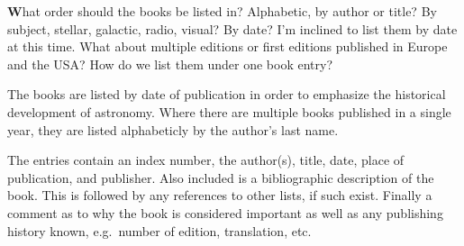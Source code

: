 



\newcommand{\bkentry}[6]{
\stepcounter{bksctr}
\vspace*{1 cm}
\noindent
\hbox{{\bf\arabic{bksctr}  #2 \hfil}}\newline
\hbox{{\it\large #3\hfil}}\newline
\hbox{{\bf #1}, #4 \hfil}\newline
\hbox{#5\hfil}\newline
\hbox{#6\hfil}\newline
\hbox{Comments:\hfil}\newline
}

%
%
\newcommand{\exbkentry}[6]{
\vspace*{1 cm}
\noindent
{\bf Index  #2}\hfil\newline
{\it\large #3}\hfil\newline
{\bf #1}, #4\hfil
#5\hfil\newline
#6\hfil\newline
Comments:\hfil\newline
}


{\textbf What order should the books be listed in? Alphabetic, by
author or title? By subject, stellar, galactic, radio, visual? By
date? I'm inclined to list them by date at this time.  What about
multiple editions or first editions published in Europe and the USA?
How do we list them under one book entry?}

The books are listed by date of publication in order to emphasize the
historical development of astronomy.  Where there are multiple books
published in a single year, they are listed alphabeticly by the
author's last name.

The entries contain an index number, the author(s), title, date, place
of publication, and publisher.  Also included is a bibliographic
description of the book.  This is followed by any references to other
lists, if such exist. Finally a comment as to why the book is
considered important as well as any publishing history known, e.g.\
number of edition, translation, etc.

